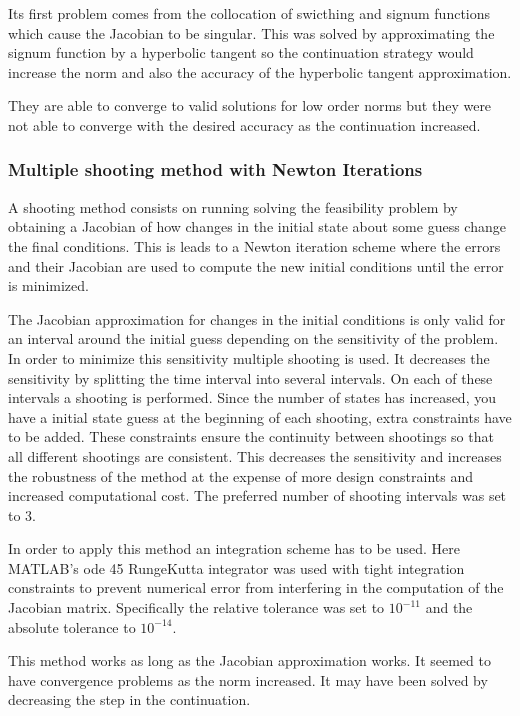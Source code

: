 Its first problem comes from the collocation of swicthing and signum functions which cause the Jacobian to be singular. This was solved by approximating the signum function by a hyperbolic tangent so the continuation strategy would increase the norm and also the accuracy of the hyperbolic tangent approximation.

They are able to converge to valid solutions for low order norms but they were not able to converge with the desired accuracy as the continuation increased.

\subsubsection{Multiple shooting method with Newton Iterations}
A shooting method consists on running solving the feasibility problem by obtaining a Jacobian of how changes in the initial state about some guess change the final conditions. This is leads to a Newton iteration scheme where the errors and their Jacobian are used to compute the new initial conditions until the error is minimized.

The Jacobian approximation for changes in the initial conditions is only valid for an interval around the initial guess depending on the sensitivity of the problem. In order to minimize this sensitivity multiple shooting is used. It decreases the sensitivity by splitting the time interval into several intervals. On each of these intervals a shooting is performed. Since the number of states has increased, you have a initial state guess at the beginning of each shooting, extra constraints have to be added. These constraints ensure the continuity between shootings so that all different shootings are consistent. This decreases the sensitivity and increases the robustness of the method at the expense of more design constraints and increased computational cost. The preferred number of shooting intervals was set to 3.

In order to apply this method an integration scheme has to be used. Here MATLAB's ode 45 RungeKutta integrator was used with tight integration constraints to prevent numerical error from interfering in the computation of the Jacobian matrix. Specifically the relative tolerance was set to $10^{-11}$ and the absolute tolerance to $10^{-14}$.

This method works as long as the Jacobian approximation works. It seemed to have convergence problems as the norm increased. It may have been solved by decreasing the step in the continuation.

